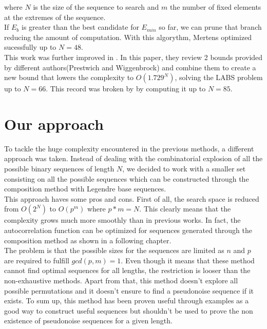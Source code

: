   where $N$ is the size of the sequence to search and $m$ the number of fixed
  elements at the extremes of the sequence.\\

  If $E_b$ is greater than the best candidate for $E_{min}$ so far, we can
  prune that branch reducing the amount of computation. With this algorythm,
  Mertens optimized sucessfully up to $N = 48$.\\

  This work was further improved in \citet{Packebusch_2016}. In this paper,
  they review 2 bounds provided by different authors(Prestwich and
  Wiggenbrock) and combine them to create a new bound that lowers the
  complexity to $O(1.729^N)$, solving the LABS problem up to $N = 66$. This
  record was broken by \citet{anatoli} by computing it up to $N = 85$.\\

  \section{Our approach}

  To tackle the huge complexity encountered in the previous methods, a different
  approach was taken. Instead of dealing with the combinatorial explosion
  of all the possible binary sequences of length $N$, we decided to work with
  a smaller set consisting on all the possible sequences which can be
  constructed through the composition method with Legendre base sequences.\\

  This approach haves some pros and cons. First of all, the search space is
  reduced from $O(2^N)$ to $O(p^m)$ where $p*m = N$. This clearly means that
  the complexity grows much more smoothly than in previous works. In fact, the
  autocorrelation function can be optimized for sequences generated through the
  composition method as shown in a following chapter.\\

  The problem is that the possible sizes for the sequences are limited as $n$
  and $p$ are required to fulfill $gcd(p, m) = 1$. Even though it means that
  these method cannot find optimal sequences for all lengths, the restriction is
  looser than the non-exhaustive methods. Apart from that, this method doesn't
  explore all possible permutations and it doesn't ensure to find a pseudonoise
  sequence if it exists. To sum up, this method has been proven useful
  through examples as a good way to construct useful sequences but shouldn't
  be used to prove the non existence of pseudonoise sequences for a given
  length.\\

